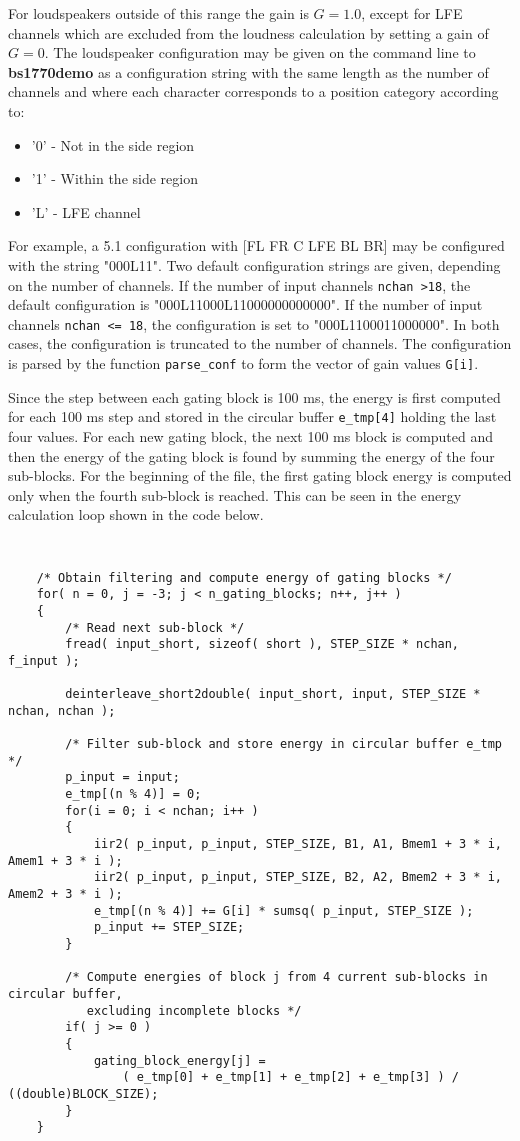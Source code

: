 For loudspeakers outside of this range the gain is $G=1.0$, except for LFE channels which are excluded
from the loudness calculation by setting a gain of $G=0$. The loudspeaker configuration may be given on
the command line to \textbf{bs1770demo} as a configuration string with the same length as the number of
channels and where each character corresponds to a position category according to:

\begin{itemize}
    \item '0' - Not in the side region
    \item '1' - Within the side region
    \item 'L' - LFE channel
\end{itemize}

For example, a 5.1 configuration with [FL FR C LFE BL BR] may be configured with the string "000L11".
Two default configuration strings are given, depending on the number of channels. If the number of input
channels \texttt{nchan \textgreater 18}, the default configuration is "000L11000L11000000000000". If the 
number of input channels \texttt{nchan \textless = 18}, the configuration is set to "000L1100011000000". 
In both cases, the configuration is truncated to the number of channels. The configuration is parsed by
the function \texttt{parse\_conf} to form the vector of gain values \texttt{G[i]}.

Since the step between each gating block is 100 ms, the energy is first computed for each 100 ms
step and stored in the circular buffer \texttt{e\_tmp[4]} holding the last four values. For each
new gating block, the next 100 ms block is computed and then the energy of the gating block is found
by summing the energy of the four sub-blocks. For the beginning of the file, the first gating block
energy is computed only when the fourth sub-block is reached. This can be seen in the energy calculation
loop shown in the code below.

{\tt\small
\begin{verbatim}
    /* Obtain filtering and compute energy of gating blocks */
    for( n = 0, j = -3; j < n_gating_blocks; n++, j++ )
    {
        /* Read next sub-block */
        fread( input_short, sizeof( short ), STEP_SIZE * nchan, f_input );

        deinterleave_short2double( input_short, input, STEP_SIZE * nchan, nchan );

        /* Filter sub-block and store energy in circular buffer e_tmp */
        p_input = input;
        e_tmp[(n % 4)] = 0;
        for(i = 0; i < nchan; i++ )
        {
            iir2( p_input, p_input, STEP_SIZE, B1, A1, Bmem1 + 3 * i, Amem1 + 3 * i );
            iir2( p_input, p_input, STEP_SIZE, B2, A2, Bmem2 + 3 * i, Amem2 + 3 * i );
            e_tmp[(n % 4)] += G[i] * sumsq( p_input, STEP_SIZE );
            p_input += STEP_SIZE;
        }

        /* Compute energies of block j from 4 current sub-blocks in circular buffer, 
           excluding incomplete blocks */
        if( j >= 0 )
        {
            gating_block_energy[j] = 
                ( e_tmp[0] + e_tmp[1] + e_tmp[2] + e_tmp[3] ) / ((double)BLOCK_SIZE);
        }
    }
\end{verbatim}
}

